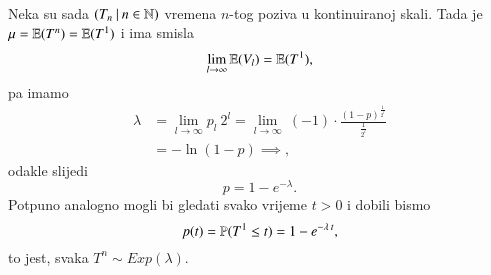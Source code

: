 \begin{pr}
\begin{equation*}
\begin{aligned}
        \end{aligned}
    \end{equation*}
    Neka su sada $({T_n} \: | \: {n \in \mathbb{N}})$ vremena $n$-tog poziva u kontinuiranoj skali.
    Tada je $\mu = \mathbb{E} (T^n) = \mathbb{E} (T^1)$ i ima smisla
    \begin{equation*}
        \lim\limits_{l \to \infty} \mathbb{E} (V_l) = \mathbb{E} (T^1),
    \end{equation*}
    pa imamo
    \begin{equation*}
        \begin{aligned}
            \lambda &= \lim\limits_{l \to \infty} p_l \: 2^l = \lim\limits_{l \to \infty} \: (-1) \cdot \frac{(1-p)^{\frac{1}{2^l}}}{\frac{1}{2^l}}\\
            &= - \ln (1 - p) \implies,
        \end{aligned}
    \end{equation*}
    odakle slijedi
    \begin{equation*}
            p = 1 - e^{-\lambda}.
    \end{equation*}
    Potpuno analogno mogli bi gledati svako vrijeme $t>0$ i dobili bismo
    \begin{equation*}
        p(t) = \mathbb{P}({T^1 \leq t}) = 1 - e^{- \lambda \: t},
    \end{equation*}
    to jest, svaka $T^n \sim Exp(\lambda)$.


\end{pr}

